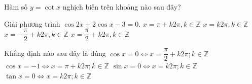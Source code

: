 \begin{ex}%
	Hàm số $y= \cot x$ nghịch biến trên  khoảng nào sau đây?
\end{ex}

\begin{ex}%
		 Giải phương trình $\cos 2x+2\cos x-3=0$.
	 \choice
			{$x=\pi+k2\pi,k\in\mathbb{Z}$} 
			 {\True $x=k2\pi,k\in\mathbb{Z}$}
			{$x=-\dfrac{\pi}{2}+k2\pi,k\in\mathbb{Z}$} 
			{$x=\dfrac{\pi}{2}+k2\pi,k\in\mathbb{Z}$} 
\end{ex}

\begin{ex}%
	Khẳng định nào  sau đây là đúng
	\choice 
		{$\cos x =0 \Leftrightarrow x =\dfrac{\pi}{2} +k2\pi; k \in  \mathbb{Z}$}
		{\True $\cos x =-1  \Leftrightarrow x =\pi +k2 \pi; k \in \mathbb{Z}$}
		{$\sin x =0 \Leftrightarrow x = k2\pi;  k \in \mathbb{Z}$}
		 {$\tan x =0 \Leftrightarrow x = k 2\pi; k \in \mathbb{Z}$}
\end{ex}
